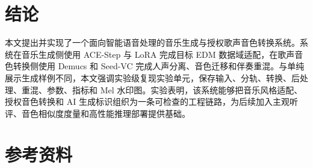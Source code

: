 \documentclass[UTF8,a4paper,zihao=-4,fontset=none]{ctexart}
\begin{document}
\section{结论}
本文提出并实现了一个面向智能语音处理的音乐生成与授权歌声音色转换系统。系统在音乐生成侧使用 ACE-Step 与 LoRA 完成目标 EDM 数据域适配，在歌声音色转换侧使用 Demucs 和 Seed-VC 完成人声分离、音色迁移和伴奏重混。与单纯展示生成样例不同，本文强调实验级复现实验单元，保存输入、分轨、转换、后处理、重混、参数、指标和 Mel 水印图。实验表明，该系统能够把音乐风格适配、授权音色转换和 AI 生成标识组织为一条可检查的工程链路，为后续加入主观听评、音色相似度度量和高性能推理部署提供基础。

\section*{参考资料}
\end{document}
